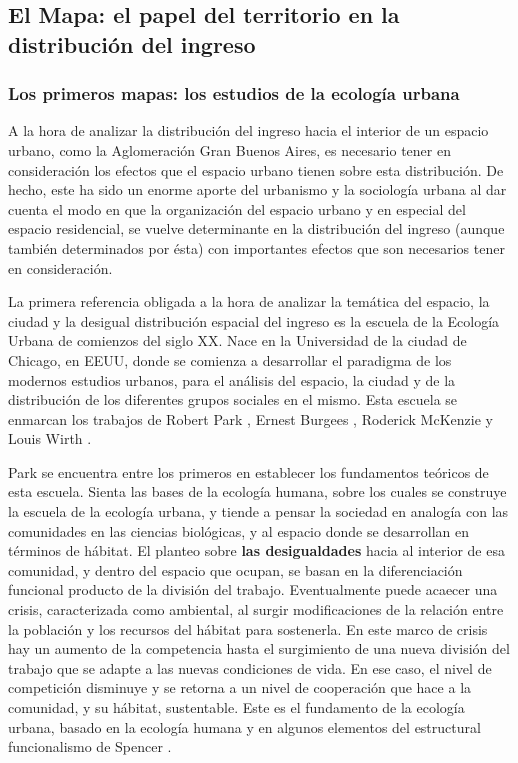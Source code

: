 	\subsection{El Mapa: el papel del territorio en la distribución del ingreso}
	
	\subsubsection{Los primeros mapas: los estudios de la ecología urbana}

A la hora de analizar la distribución del ingreso hacia el interior de un espacio urbano, como la Aglomeración Gran Buenos Aires, es necesario tener en consideración los efectos que el espacio urbano tienen sobre esta distribución. De hecho, este ha sido un enorme aporte del urbanismo y la sociología urbana\cite{park,burgess1928,mckenzie,wirth,lefebvre,harvey,castells} al dar cuenta el modo en que la organización del espacio urbano y en especial del espacio residencial, se vuelve determinante en la distribución del ingreso (aunque también determinados por ésta) con importantes efectos que son necesarios tener en consideración. 

La primera referencia obligada a la hora de analizar la temática del espacio, la ciudad y la desigual distribución espacial del ingreso es la escuela de la Ecología Urbana de comienzos del siglo XX. Nace en la Universidad de la ciudad de Chicago, en EEUU, donde se comienza a desarrollar el paradigma de los modernos estudios urbanos, para el análisis del espacio, la ciudad y de la distribución de los diferentes grupos sociales en el mismo. Esta escuela se enmarcan los trabajos de Robert Park \citeyear{park}, Ernest Burgees \citeyear{burgess1928}, Roderick McKenzie \citeyear{mckenzie} y Louis Wirth \citeyear{wirth}.

Park se encuentra entre los primeros en establecer los fundamentos teóricos de esta escuela. Sienta las bases de la ecología humana, sobre los cuales se construye la escuela de la ecología urbana, y tiende a pensar la sociedad en analogía con las comunidades en las ciencias biológicas, y al espacio donde se desarrollan en términos de hábitat. El planteo sobre \textbf{las desigualdades} hacia al interior de esa comunidad, y dentro del espacio que ocupan, se basan en la diferenciación funcional producto de la división del trabajo. Eventualmente puede acaecer una crisis, caracterizada como ambiental, al surgir modificaciones de la relación entre la población y los recursos del hábitat para sostenerla. En este marco de crisis hay un aumento de la competencia hasta el surgimiento de una nueva división del trabajo que se adapte a las nuevas condiciones de vida. En ese caso, el nivel de competición disminuye y se retorna a un nivel de cooperación que hace a la comunidad, y su hábitat, sustentable. Este es el fundamento de la ecología urbana, basado en la ecología humana y en algunos elementos del estructural funcionalismo de Spencer \cite{park,betin,gottdiener}.

